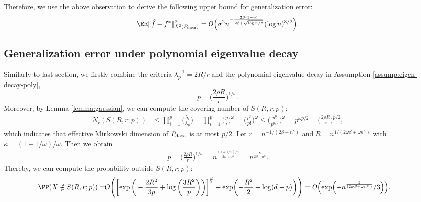      Therefore, we use the above observation to derive the following upper bound for generalization error:
    \begin{align*}
         \EE \norm{ \hat{f} - f^*}^2_{L^2(P_{\rm data})} = O\Bigl( \sigma^2 n^{- \frac{2\beta(1-\eta)}{2\beta+\sqrt{\log n/\theta}}}(\log n)^{3/2} \Bigr).
    \end{align*}


\subsection{Generalization error under polynomial eigenvalue decay}\label{sec:dim-poly}
    
     Similarly to last section, we firstly combine the criteria $\lambda_p^{-1}=2R/r$ and the polynomial eigenvalue decay in Assumption \ref{assump:eigen-decay-poly},     \begin{equation*}
         p = \biggl( \frac{2\rho R}{r} \biggr)^{1/\omega}.
    \end{equation*}
    Moreover, by Lemma \ref{lemma:gaussian}, we can compute the covering number of $S(R,r,p)$:
    \begin{align*}
        N_r(S(R,r;p)) &\leq \prod_{i=1}^p \bigg( \frac{\lambda_i}{\lambda_p}\bigg) =  \prod_{i=1}^p \biggl(\frac{p}{i}\biggr)^\omega = \biggl(\frac{p^p}{p!}\biggr)^\omega \leq \biggl(\frac{p^p}{p^{p/2}}\biggr)^\omega =  p^{\omega p/2} =  \biggl(\frac{2\rho R}{r}\biggr)^{p/2} ,
    \end{align*}
    which indicates that effective Minkowski dimension of $P_{\rm data}$ is at most $p/2$. Let $r=n^{-1/(2\beta+ n^\kappa)}$ and $R=n^{1/(2\omega\beta+ \omega n^\kappa)}$ with $\kappa = (1+1/\omega)/\omega$. Then we obtain
    \begin{align*}
        p = \biggl( \frac{2\rho R}{r} \biggr)^{1/\omega} =  n^{\frac{(1+1/\omega)/\omega}{2\beta+ n^\kappa}} = n^{\frac{\kappa}{2\beta+ n^\kappa}}.
    \end{align*}
    Thereby, we can compute the probability outside $S(R,r;p)$:
    \begin{align*}
        \PP(X \notin S(R,r;p) ) =& O \Biggl( \biggl[ \exp \bigg(-\frac{2R^2}{3p} + \log\bigg( \frac{3R^2}{p} \bigg) \bigg) \biggr]^{\frac{p}{2}}  + \exp\biggl( -\frac{R^2}{2}+\log(d-p)  \biggr) \Biggr) = O\Bigl(\exp\Bigl(-n^{\frac{2}{(2\omega\beta+ \omega n^\kappa)}}/3\Bigr) \Bigr).
    \end{align*}
    
